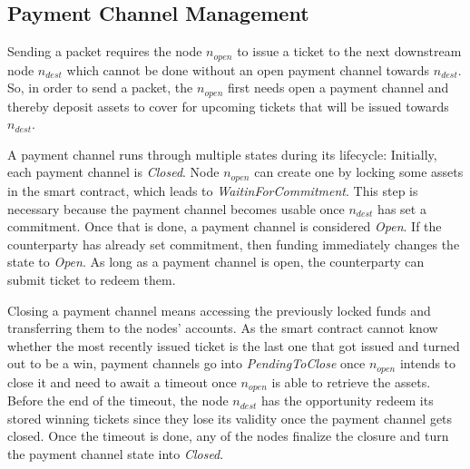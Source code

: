\subsection{Payment Channel Management}
\label{sec:incentives:channels}

Sending a packet requires the node $n_{open}$ to issue a ticket to the next downstream node $n_{dest}$ which cannot be done without an open payment channel towards $n_{dest}$. So, in order to send a packet, the $n_{open}$ first needs open a payment channel and thereby deposit assets to cover for upcoming tickets that will be issued towards $n_{dest}$.

A payment channel runs through multiple states during its lifecycle: Initially, each payment channel is \textit{Closed}. Node $n_{open}$ can create one by locking some assets in the smart contract, which leads to \textit{WaitinForCommitment}. This step is necessary because the payment channel becomes usable once $n_{dest}$ has set a commitment. Once that is done, a payment channel is considered \textit{Open}. If the counterparty has already set commitment, then funding immediately changes the state to \textit{Open}. As long as a payment channel is open, the counterparty can submit ticket to redeem them.

Closing a payment channel means accessing the previously locked funds and transferring them to the nodes' accounts. As the smart contract cannot know whether the most recently issued ticket is the last one that got issued and turned out to be a win, payment channels go into \textit{PendingToClose} once $n_{open}$ intends to close it and need to await a timeout once $n_{open}$ is able to retrieve the assets. Before the end of the timeout, the node $n_{dest}$ has the opportunity redeem its stored winning tickets since they lose its validity once the payment channel gets closed. Once the timeout is done, any of the nodes finalize the closure and turn the payment channel state into \textit{Closed}.

